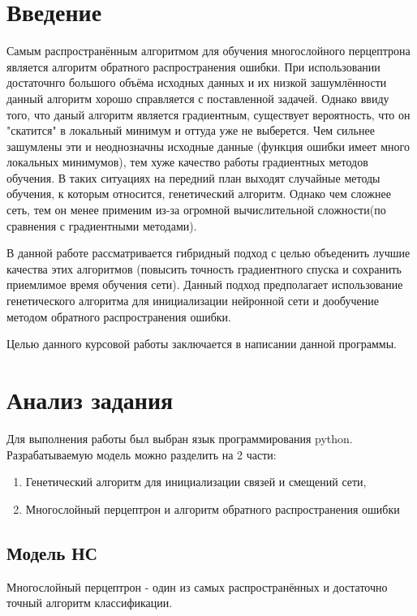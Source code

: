 \documentclass[a4paper,12pt]{article}
\begin{document}
\newpage\section*{Введение}
Самым распространённым алгоритмом для обучения многослойного перцептрона является алгоритм обратного распространения ошибки. При использовании достаточнго большого объёма исходных данных и их низкой зашумлённости данный алгоритм хорошо справляется с поставленной задачей. Однако ввиду того, что даный алгоритм является градиентным, существует вероятность, что он "скатится" в локальный минимум и оттуда уже не выберется. Чем сильнее зашумлены эти и неоднозначны исходные данные (функция ошибки имеет много локальных минимумов), тем хуже качество работы градиентных методов обучения. В таких ситуациях на передний план выходят случайные методы обучения, к которым относится, генетический алгоритм. Однако чем сложнее сеть, тем он менее применим из-за огромной вычислительной сложности(по сравнения с градиентными методами). 
\par В данной работе рассматривается гибридный подход с целью объеденить лучшие качества этих алгоритмов (повысить точность градиентного спуска и сохранить приемлимое время обучения сети). Данный подход предполагает использование генетического алгоритма для инициализации нейронной сети и дообучение методом обратного распространения ошибки.
\par 

\par Целью данного курсовой работы заключается в написании данной программы.


\newpage\section{Анализ задания}
Для выполнения работы был выбран язык программирования python. Разрабатываемую модель можно разделить на 2 части: 
\begin{enumerate}
\item Генетический алгоритм для инициализации связей и смещений сети,
\item Многослойный перцептрон и алгоритм обратного распространения ошибки
\end{enumerate}

\subsection{Модель НС}
Многослойный перцептрон - один из самых распространённых и достаточно точный алгоритм классификации.
\end{document}
